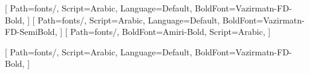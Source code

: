 
\usepackage{fontspec}                 %
\usepackage{amsmath, amssymb}
\usepackage{geometry}
\usepackage[table]{xcolor}
\usepackage{graphicx}
\usepackage{tikz}
\usetikzlibrary{calc, shadows, shapes.geometric}
\usepackage[skins,breakable]{tcolorbox}
\usepackage{fancyhdr}
\usepackage{enumitem}
\usepackage{multicol}
\usepackage{tabularx, longtable, array, multirow}
\usepackage{etoolbox}
\usepackage{footmisc}
\usepackage{hyperref}

\newcommand{\JBookTitle}{عربی، زبانِ قرآن — پایهٔ دوازدهم}
\newcommand{\JBookSubtitle}{جزوهٔ جامعِ آموزشیِ عربی دوازدهم (علوم انسانی)}
\newcommand{\JAuthor}{به تدریس: دکتر مریم هاشمیان}
\newcommand{\JBookNote}{مطابق با کتابِ درسیِ عربی، زبانِ قرآن (۲) — رشتهٔ علوم انسانی}



\newfontfamily{}[
  Path=fonts/,
  Script=Arabic,
  Language=Default,
  BoldFont=Vazirmatn-FD-Bold,
]
\newfontfamily{}[
  Path=fonts/,
  Script=Arabic,
  Language=Default,
  BoldFont=Vazirmatn-FD-SemiBold,
]
\newfontfamily{}[
  Path=fonts/,
  BoldFont=Amiri-Bold,
  Script=Arabic,
]

\newcommand{\JUIFont}{\VazirUIF}                      %
\newcommand{\Ar}{\AmiriF\fontsize{11.6}{16.6}\selectfont}   %
\newcommand{\ArB}{\AmiriF\bfseries}                          %

\providecommand{\JRTL}[1]{#1}



\usepackage{xepersian}
\makeatletter
\providecommand{\UseMathForPositioningText}{\m@th}
\providecommand{\UseStandardTextForPositioning}{}
\makeatother
{}[
  Path=fonts/,
  Script=Arabic,
  Language=Default,
  BoldFont=Vazirmatn-FD-Bold,
]
\renewcommand{\JRTL}[1]{\RL{#1}}


